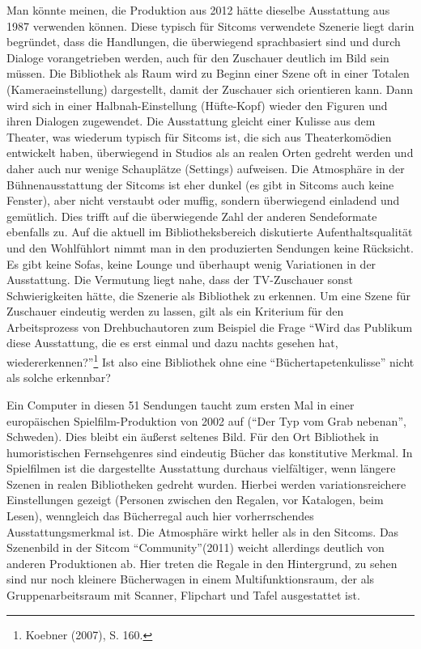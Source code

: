 
Man könnte meinen, die Produktion aus 2012 hätte dieselbe Ausstattung
aus 1987 verwenden können. Diese typisch für Sitcoms verwendete Szenerie
liegt darin begründet, dass die Handlungen, die überwiegend
sprachbasiert sind und durch Dialoge vorangetrieben werden, auch für den
Zuschauer deutlich im Bild sein müssen. Die Bibliothek als Raum wird zu
Beginn einer Szene oft in einer Totalen (Kameraeinstellung) dargestellt,
damit der Zuschauer sich orientieren kann. Dann wird sich in einer
Halbnah-Einstellung (Hüfte-Kopf) wieder den Figuren und ihren Dialogen
zugewendet. Die Ausstattung gleicht einer Kulisse aus dem Theater, was
wiederum typisch für Sitcoms ist, die sich aus Theaterkomödien
entwickelt haben, überwiegend in Studios als an realen Orten gedreht
werden und daher auch nur wenige Schauplätze (Settings)
aufweisen. Die Atmosphäre in der Bühnenausstattung der Sitcoms ist eher
dunkel (es gibt in Sitcoms auch keine Fenster), aber nicht verstaubt
oder muffig, sondern überwiegend einladend und gemütlich. Dies trifft
auf die überwiegende Zahl der anderen Sendeformate ebenfalls zu. Auf die
aktuell im Bibliotheksbereich diskutierte Aufenthaltsqualität und den
Wohlfühlort nimmt man in den produzierten Sendungen keine Rücksicht. Es
gibt keine Sofas, keine Lounge und überhaupt wenig Variationen in der
Ausstattung. Die Vermutung liegt nahe, dass der TV-Zuschauer sonst
Schwierigkeiten hätte, die Szenerie als Bibliothek zu erkennen. Um eine
Szene für Zuschauer eindeutig werden zu lassen, gilt als ein Kriterium
für den Arbeitsprozess von Drehbuchautoren zum Beispiel die Frage
\enquote{Wird das Publikum diese Ausstattung, die es erst einmal und
dazu nachts gesehen hat, wiedererkennen?}\footnote{Koebner (2007), S.
  160.} Ist also eine Bibliothek ohne eine \enquote{Büchertapetenkulisse}
nicht als solche erkennbar?

Ein Computer in diesen 51 Sendungen taucht zum ersten Mal in einer
europäischen Spielfilm-Produktion von 2002 auf (\enquote{Der Typ vom
Grab nebenan}, Schweden). Dies bleibt ein äußerst seltenes Bild. Für den
Ort Bibliothek in humoristischen Fernsehgenres sind eindeutig Bücher das
konstitutive Merkmal. In Spielfilmen ist die dargestellte Ausstattung
durchaus vielfältiger, wenn längere Szenen in realen Bibliotheken
gedreht wurden. Hierbei werden variationsreichere Einstellungen gezeigt
(Personen zwischen den Regalen, vor Katalogen, beim Lesen), wenngleich
das Bücherregal auch hier vorherrschendes Ausstattungsmerkmal ist. Die
Atmosphäre wirkt heller als in den Sitcoms. Das Szenenbild in der Sitcom
\enquote{Community}(2011) weicht allerdings deutlich von anderen
Produktionen ab. Hier treten die Regale in den Hintergrund, zu sehen
sind nur noch kleinere Bücherwagen in einem Multifunktionsraum, der als
Gruppenarbeitsraum mit Scanner, Flipchart und Tafel ausgestattet ist.

